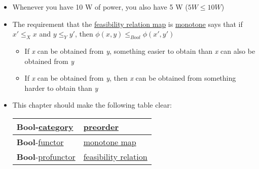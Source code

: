 \begin{itemize}
    \item  Whenever you have 10 W of power, you also have 5 W ($5 W \leq 10 W$)
    \item The requirement that the \href{doc/1 math/Seven Sketches in Compositionality/Chapter 4: Co-design/2 Enriched profunctors/1 Feasibility relationships as Bool-profunctors/1 Feasilibiliy relation}{feasibility relation map} is \href{doc/1 math/Seven Sketches in Compositionality/Chapter 1: Generative Effects/4 Monotone maps/1 Monotone map}{monotone} says that if $x' \leq_X x$ and $y \leq_Y y'$, then $\phi(x,y) \leq_{Bool} \phi(x',y')$
          \begin{itemize}
            \item If \emph{x} can be obtained from \emph{y}, something easier to obtain than \emph{x} can also be obtained from \emph{y}
            \item If \emph{x} can be obtained from \emph{y}, then \emph{x} can be obtained from something harder to obtain than \emph{y}
          \end{itemize}
    \item This chapter should make the following table clear:
  \begin{minipage}{0.48\textwidth}

    \begin{tabular}{|l|l|}
      \hline
      \textbf{Bool}-\href{doc/1 math/Seven Sketches in Compositionality/Chapter 2: Resource theories/3 Enrichment/1 V-categories/1 V-category}{category}  & \href{doc/1 math/Seven Sketches in Compositionality/Chapter 1: Generative Effects/3 Preorders/1 Preorder}{preorder}            \\ \hline
      \textbf{Bool}-\href{doc/1 math/Seven Sketches in Compositionality/Chapter 2: Resource theories/4 Constructions on V-categories/2 Enriched functors/1 V-functor}{functor}   & \href{doc/1 math/Seven Sketches in Compositionality/Chapter 1: Generative Effects/4 Monotone maps/1 Monotone map}{monotone map}        \\ \hline
      \textbf{Bool}-\href{doc/1 math/Seven Sketches in Compositionality/Chapter 4: Co-design/2 Enriched profunctors/2 V-profunctors/1 V-profunctor}{profunctor} & \href{doc/1 math/Seven Sketches in Compositionality/Chapter 4: Co-design/2 Enriched profunctors/1 Feasibility relationships as Bool-profunctors/1 Feasilibiliy relation}{feasibility relation} \\ \hline
    \end{tabular}
  \end{minipage}


\end{itemize}
